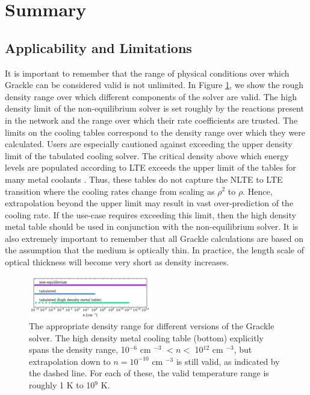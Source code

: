 \section{Summary} \label{sec:summary}

\subsection{Applicability and Limitations}

It is important to remember that the range of physical conditions over
which Grackle can be considered valid is not unlimited.  In Figure
\ref{fig:valid-range}, we show the rough density range over which
different components of the solver are valid.  The high density limit
of the non-equilibrium solver is set roughly by the reactions present
in the network and the range over which their rate coefficients are
trusted.  The limits on the cooling tables correspond to the density
range over which they were calculated.  Users are especially
cautioned against exceeding the upper density limit of the tabulated
cooling solver.  The critical density above which energy levels are
populated according to LTE exceeds the upper limit of the tables for
many metal coolants \citep{2008MNRAS.385.1443S}.  Thus, these tables
do not capture the NLTE to LTE transition where the cooling rates
change from scaling as $\rho^{2}$ to $\rho$.  Hence, extrapolation
beyond the upper limit may result in vast over-prediction of the
cooling rate.  If the use-case requires exceeding this limit, then the
high density metal table should be used in conjunction with the
non-equilibrium solver.  It is also extremely important to remember
that all Grackle calculations are based on the assumption that the
medium is optically thin.  In practice, the length scale of optical
thickness will become very short as density increases.

\begin{figure}
  \centering
  \includegraphics[width=0.48\textwidth]{valid_range.pdf}
  \caption{
    The appropriate density range for different versions of the
    Grackle solver.  The high density metal cooling table (bottom)
    explicitly spans the density range, 10$^{-6}$ cm $^{-3}$ $< n <$
    10$^{12}$ cm $^{-3}$, but extrapolation down to $n = 10^{-10}$ cm
    $^{-3}$ is still valid, as indicated by the dashed line.  For each
    of these, the valid temperature range is roughly 1 K to 10$^{9}$
    K.
  } \label{fig:valid-range}
\end{figure}

